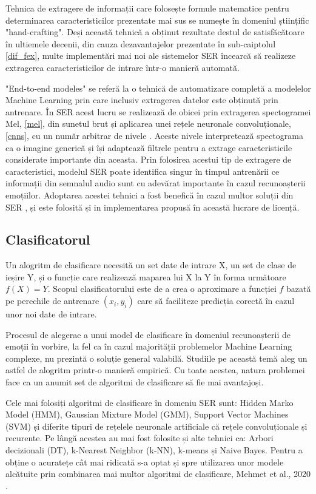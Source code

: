 \documentclass[a4paper,12pt]{book}
\begin{document}
						Tehnica de extragere de informații care folosește formule matematice pentru determinarea caracteristicilor prezentate mai sus se numește în domeniul științific "hand-crafting". Deși această tehnică a obținut rezultate destul de satisfăcătoare în ultiemele decenii, din cauza dezavantajelor prezentate în sub-caiptolul \ref{dif_fex}, multe implementări mai noi ale sistemelor SER încearcă să realizeze extragerea caracteristicilor de intrare într-o manieră automată. \par 
						
						"End-to-end modeles" se referă la o tehnică de automatizare completă a modelelor Machine Learning prin care inclusiv extragerea datelor este obținută prin antrenare. În SER acest lucru se realizează de obicei prin extragerea spectogramei Mel, \ref{mel}, din sunetul brut și aplicarea unei rețele neuronale convoluționale, \ref{cnns}, cu un număr arbitrar de nivele \cite{graves,tzir}. Aceste nivele interpretează spectograma ca o imagine generică și își adaptează filtrele pentru a extrage caracteristicile considerate importante din aceasta. Prin folosirea acestui tip de extragere de caracteristici, modelul SER poate identifica singur în timpul antrenării ce informații din semnalul audio sunt cu adevărat importante în cazul recunoașterii emoțiilor. Adoptarea acestei tehnici a fost benefică în cazul multor soluții din SER \cite{graves, tzir, zhang, yuan, adieu, e2e}, și este folosită și in implementarea propusă în această lucrare de licență.
					\subsection{Clasificatorul}
						Un alogritm de clasificare necesită un set date de intrare X, un set de clase de ieșire Y, și o funcție care realizează maparea lui X la Y în forma următoare \(f(X)=Y\). Scopul clasificatorului este de a crea o aproximare a funcției \(f\) bazată pe perechile de antrenare $(x_i,y_i)$ care să faciliteze predicția corectă în cazul unor noi date de intrare. \par
						
						Procesul de alegerae a unui model de clasificare în domeniul recunoașterii de emoții în vorbire, la fel ca în cazul majorității problemelor Machine Learning complexe, nu prezintă o soluție general valabilă. Studiile pe această temă aleg un astfel de alogritm printr-o manieră empirică. Cu toate acestea, natura problemei face ca un anumit set de algoritmi de clasificare să fie mai avantajoși.\par 
						Cele mai folosiți algoritmi de clasificare în domeniu SER sunt: Hidden Marko Model (HMM), Gaussian Mixture Model (GMM), Support Vector Machines (SVM) și diferite tipuri de rețelele neuronale artificiale că rețele convoluționale și recurente. Pe lângă acestea au mai fost folosite și alte tehnici ca: Arbori decizionali (DT), k-Nearest Neighbor (k-NN), k-means și Naive Bayes. Pentru a obține o acuratețe cât mai ridicată s-a optat și spre utilizarea unor modele alcătuite prin combinarea mai multor algoritmi de clasificare, Mehmet et al., 2020 \cite{mehmet}.
							
\end{document}
